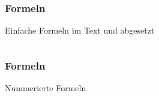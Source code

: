 \begin{frame}
    \frametitle{Formeln}
    \begin{block}{Einfache Formeln im Text und abgesetzt}
        \begin{columns}
            \begin{column}{0.60\textwidth}
                
            \end{column}
            \pause
            \begin{column}{0.3\textwidth}
                \centering
                
            \end{column}
        \end{columns}
        \pause
        \begin{columns}
            \begin{column}{0.60\textwidth}
                
            \end{column}
            \pause
            \begin{column}{0.3\textwidth}
                \centering
                
            \end{column}
        \end{columns}
    \end{block}
\end{frame}
\begin{frame}
    \frametitle{Formeln}
    \begin{block}{Nummerierte Formeln}
        
        \pause
        
    \end{block}
\end{frame}
